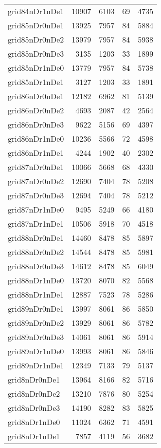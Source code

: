 \begin{longtable}{lrrrr}
grid84nDr1nDe1 & 10907 & 6103 & 69 & 4735 \\
grid85nDr0nDe1 & 13925 & 7957 & 84 & 5884 \\
grid85nDr0nDe2 & 13979 & 7957 & 84 & 5938 \\
grid85nDr0nDe3 & 3135 & 1203 & 33 & 1899 \\
grid85nDr1nDe0 & 13779 & 7957 & 84 & 5738 \\
grid85nDr1nDe1 & 3127 & 1203 & 33 & 1891 \\
grid86nDr0nDe1 & 12182 & 6962 & 81 & 5139 \\
grid86nDr0nDe2 & 4693 & 2087 & 42 & 2564 \\
grid86nDr0nDe3 & 9622 & 5156 & 69 & 4397 \\
grid86nDr1nDe0 & 10236 & 5566 & 72 & 4598 \\
grid86nDr1nDe1 & 4244 & 1902 & 40 & 2302 \\
grid87nDr0nDe1 & 10066 & 5668 & 68 & 4330 \\
grid87nDr0nDe2 & 12690 & 7404 & 78 & 5208 \\
grid87nDr0nDe3 & 12694 & 7404 & 78 & 5212 \\
grid87nDr1nDe0 & 9495 & 5249 & 66 & 4180 \\
grid87nDr1nDe1 & 10506 & 5918 & 70 & 4518 \\
grid88nDr0nDe1 & 14460 & 8478 & 85 & 5897 \\
grid88nDr0nDe2 & 14544 & 8478 & 85 & 5981 \\
grid88nDr0nDe3 & 14612 & 8478 & 85 & 6049 \\
grid88nDr1nDe0 & 13720 & 8070 & 82 & 5568 \\
grid88nDr1nDe1 & 12887 & 7523 & 78 & 5286 \\
grid89nDr0nDe1 & 13997 & 8061 & 86 & 5850 \\
grid89nDr0nDe2 & 13929 & 8061 & 86 & 5782 \\
grid89nDr0nDe3 & 14061 & 8061 & 86 & 5914 \\
grid89nDr1nDe0 & 13993 & 8061 & 86 & 5846 \\
grid89nDr1nDe1 & 12349 & 7133 & 79 & 5137 \\
grid8nDr0nDe1 & 13964 & 8166 & 82 & 5716 \\
grid8nDr0nDe2 & 13210 & 7876 & 80 & 5254 \\
grid8nDr0nDe3 & 14190 & 8282 & 83 & 5825 \\
grid8nDr1nDe0 & 11024 & 6362 & 71 & 4591 \\
grid8nDr1nDe1 & 7857 & 4119 & 56 & 3682 \\

\end{longtable}
